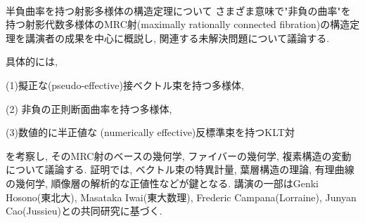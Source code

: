 \documentclass[a4]{jarticle}
\theoremstyle{plain} %
\theoremstyle{definition} %
\begin{document}
\newpage
{}\\
半負曲率を持つ射影多様体の構造定理について
\vskip3mm
さまざま意味で"非負の曲率"を持つ射影代数多様体のMRC射(maximally rationally connected
fibration)の構造定理を講演者の成果を中心に概説し, 関連する未解決問題について議論する. 

具体的には, 

(1)擬正な(pseudo-effective)接ベクトル束を持つ多様体, 

(2) 非負の正則断面曲率を持つ多様体, 

(3)数値的に半正値な
(numerically effective)反標準束を持つKLT対

を考察し, そのMRC射のベースの幾何学, ファイバーの幾何学,
複素構造の変動について議論する.  証明では, ベクトル束の特異計量, 葉層構造の理論, 有理曲線の幾何学, 順像層の解析的な正値性などが鍵となる.
講演の一部はGenki Hosono(東北大), Masataka Iwai(東大数理), Frederic Campana(Lorraine),
Junyan Cao(Jussieu)との共同研究に基づく.
\vskip5mm
\end{document}
